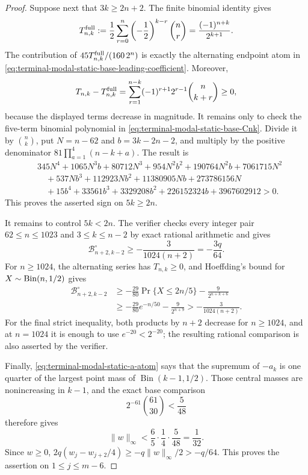 \begin{proof}
Suppose next that $3k\ge2n+2$.  The finite binomial identity gives
\[
 T_{n,k}^{\rm full}:=\frac12\sum_{r=0}^n
 \left(-\frac12\right)^{k-r}\binom nr
 =\frac{(-1)^{n+k}}{2^{k+1}}.
\]
The contribution of $45T_{n,k}^{\rm full}/(160\,2^n)$ is exactly the
alternating endpoint atom in
\eqref{eq:terminal-modal-static-base-leading-coefficient}.  Moreover,
\[
 T_{n,k}-T_{n,k}^{\rm full}
 =\sum_{r=1}^{n-k}(-1)^{r+1}2^{r-1}\binom n{k+r}\ge0,
\]
because the displayed terms decrease in magnitude.  It remains only to
check the five-term binomial polynomial in
\eqref{eq:terminal-modal-static-base-Cnk}.  Divide it by $\binom nk$, put
$N=n-62$ and $b=3k-2n-2$, and multiply by the positive denominator
$81\prod_{a=1}^4(n-k+a)$.  The result is
\begin{align*}
 &345N^4+1065N^3b+80712N^3+954N^2b^2+190764N^2b
   +7061715N^2\\
 &\quad+537Nb^3+112923Nb^2+11380905Nb+273786156N\\
 &\quad+15b^4+33561b^3+3329208b^2+226152324b
   +3967602912>0.
\end{align*}
This proves the asserted sign on $5k\ge2n$.

It remains to control $5k<2n$.  The verifier checks every integer pair
$62\le n\le1023$ and $3\le k\le n-2$ by exact rational arithmetic and gives
\begin{equation}
 \mathcal B_{n+2,k-2}^\circ\ge-\frac3{1024(n+2)}
 =-\frac{3q}{64}.
 \label{eq:terminal-modal-static-base-finite-certificate}
\end{equation}
For $n\ge1024$, the alternating series has $T_{n,k}\ge0$, and Hoeffding's
bound for $X\sim{\rm Bin}(n,1/2)$ gives
\begin{align*}
 \mathcal B_{n+2,k-2}^\circ
 &\ge-\frac{29}{80}\Pr\{X\le2n/5\}
       -\frac9{2^{n+k+6}}\\
 &\ge-\frac{29}{80}e^{-n/50}-\frac9{2^{n+9}}
 >-\frac3{1024(n+2)}.
\end{align*}
For the final strict inequality, both products by $n+2$ decrease for
$n\ge1024$, and at $n=1024$ it is enough to use $e^{-20}<2^{-20}$;
the resulting rational comparison is also asserted by the verifier.

Finally, \eqref{eq:terminal-modal-static-a-atom} says that the supremum of
$-a_k$ is one quarter of the largest point mass of
$\operatorname{Bin}(k-1,1/2)$.  Those central masses are nonincreasing in
$k-1$, and the exact base comparison
\[
 2^{-61}\binom{61}{30}<\frac5{48}
\]
therefore gives
\[
 \lVert w\rVert_\infty
 <\frac65\cdot\frac14\cdot\frac5{48}=\frac1{32}.
\]
Since $w\ge0$,
$2q(w_j-w_{j+2}/4)\ge-q\lVert w\rVert_\infty/2>-q/64$.
This proves the assertion on $1\le j\le m-6$.


\end{proof}
